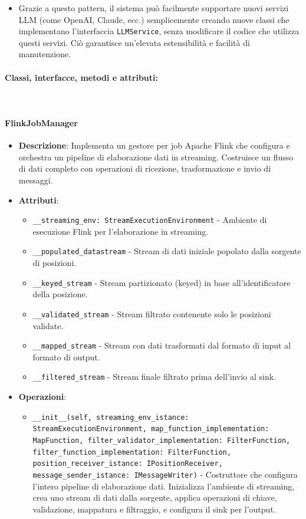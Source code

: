 \documentclass[10pt]{article}
\newcommand{\myparagraph}[1]{\paragraph{#1}\mbox{}\\}
\begin{document}
\begin{itemize}
\begin{itemize}
        \item Grazie a questo pattern, il sistema può facilmente supportare nuovi servizi LLM (come OpenAI, Claude, ecc.) semplicemente creando nuove classi che implementano l'interfaccia \texttt{LLMService}, senza modificare il codice che utilizza questi servizi. Ciò garantisce un'elevata estensibilità e facilità di manutenzione.
    \end{itemize}
    \end{itemize}


    \myparagraph{Classi, interfacce, metodi e attributi:}

    \paragraph{FlinkJobManager}
    \begin{itemize} 
    \item \textbf{Descrizione}: Implementa un gestore per job Apache Flink che configura e orchestra un pipeline di elaborazione dati in streaming. Costruisce un flusso di dati completo con operazioni di ricezione, trasformazione e invio di messaggi.
    \item \textbf{Attributi}:
    \begin{itemize}
        \item \texttt{\_\_streaming\_env: StreamExecutionEnvironment} - Ambiente di esecuzione Flink per l'elaborazione in streaming.
        \item \texttt{\_\_populated\_datastream} - Stream di dati iniziale popolato dalla sorgente di posizioni.
        \item \texttt{\_\_keyed\_stream} - Stream partizionato (keyed) in base all'identificatore della posizione.
        \item \texttt{\_\_validated\_stream} - Stream filtrato contenente solo le posizioni validate.
        \item \texttt{\_\_mapped\_stream} - Stream con dati trasformati dal formato di input al formato di output.
        \item \texttt{\_\_filtered\_stream} - Stream finale filtrato prima dell'invio al sink.
    \end{itemize}
    
    \item \textbf{Operazioni}:
    \begin{itemize}
        \item \texttt{\_\_init\_\_(self, streaming\_env\_istance: StreamExecutionEnvironment, map\_function\_implementation: MapFunction, filter\_validator\_implementation: FilterFunction, filter\_function\_implementation: FilterFunction, position\_receiver\_istance: IPositionReceiver, message\_sender\_istance: IMessageWriter)} - Costruttore che configura l'intero pipeline di elaborazione dati. Inizializza l'ambiente di streaming, crea uno stream di dati dalla sorgente, applica operazioni di chiave, validazione, mappatura e filtraggio, e configura il sink per l'output.
        

\end{itemize}
\end{itemize}
\end{document}
